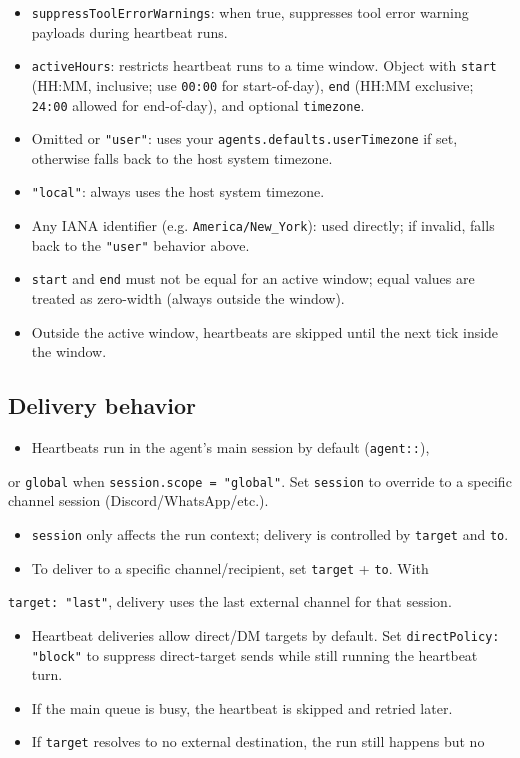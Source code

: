 \begin{itemize}
  \item \texttt{suppressToolErrorWarnings}: when true, suppresses tool error warning payloads during heartbeat runs.
  \item \texttt{activeHours}: restricts heartbeat runs to a time window. Object with \texttt{start} (HH:MM, inclusive; use \texttt{00:00} for start-of-day), \texttt{end} (HH:MM exclusive; \texttt{24:00} allowed for end-of-day), and optional \texttt{timezone}.
  \item Omitted or \texttt{"user"}: uses your \texttt{agents.defaults.userTimezone} if set, otherwise falls back to the host system timezone.
  \item \texttt{"local"}: always uses the host system timezone.
  \item Any IANA identifier (e.g. \texttt{America/New\_York}): used directly; if invalid, falls back to the \texttt{"user"} behavior above.
  \item \texttt{start} and \texttt{end} must not be equal for an active window; equal values are treated as zero-width (always outside the window).
  \item Outside the active window, heartbeats are skipped until the next tick inside the window.
\end{itemize}


\subsection{Delivery behavior}


\begin{itemize}
  \item Heartbeats run in the agent’s main session by default (\texttt{agent::}),
\end{itemize}

or \texttt{global} when \texttt{session.scope = "global"}. Set \texttt{session} to override to a
specific channel session (Discord/WhatsApp/etc.).
\begin{itemize}
  \item \texttt{session} only affects the run context; delivery is controlled by \texttt{target} and \texttt{to}.
  \item To deliver to a specific channel/recipient, set \texttt{target} + \texttt{to}. With
\end{itemize}

\texttt{target: "last"}, delivery uses the last external channel for that session.
\begin{itemize}
  \item Heartbeat deliveries allow direct/DM targets by default. Set \texttt{directPolicy: "block"} to suppress direct-target sends while still running the heartbeat turn.
  \item If the main queue is busy, the heartbeat is skipped and retried later.
  \item If \texttt{target} resolves to no external destination, the run still happens but no
\end{itemize}

